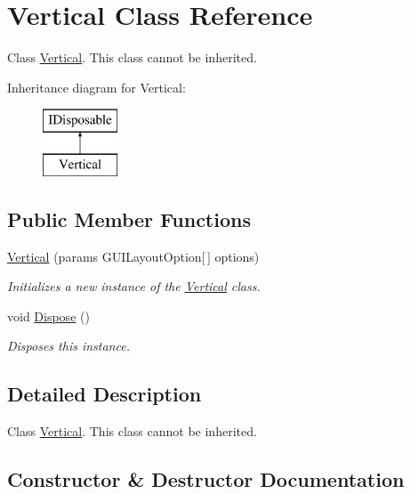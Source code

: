 \hypertarget{class_vertical}{}\section{Vertical Class Reference}
\label{class_vertical}


Class \hyperlink{class_vertical}{Vertical}. This class cannot be inherited.  


Inheritance diagram for Vertical\+:\begin{figure}[H]
\begin{center}
\leavevmode
\includegraphics[height=2.000000cm]{class_vertical}
\end{center}
\end{figure}
\subsection*{Public Member Functions}
\begin{DoxyCompactItemize}
\item 
\hyperlink{class_vertical_aaee460a9350081c85120865887dd588e}{Vertical} (params G\+U\+I\+Layout\+Option\mbox{[}$\,$\mbox{]} options)
\begin{DoxyCompactList}\small\item\em Initializes a new instance of the \hyperlink{class_vertical}{Vertical} class. \end{DoxyCompactList}\item 
void \hyperlink{class_vertical_a3329b58e37483e88511f34f2fe7eea72}{Dispose} ()
\begin{DoxyCompactList}\small\item\em Disposes this instance. \end{DoxyCompactList}\end{DoxyCompactItemize}


\subsection{Detailed Description}
Class \hyperlink{class_vertical}{Vertical}. This class cannot be inherited. 



\subsection{Constructor \& Destructor Documentation}
\mbox{\label{class_vertical_aaee460a9350081c85120865887dd588e}} 
